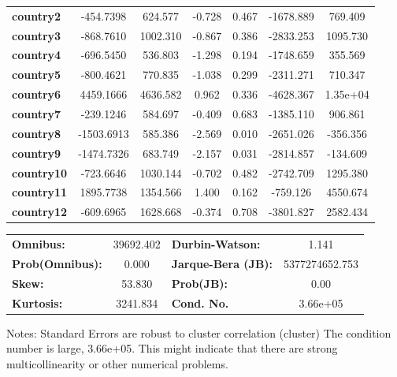 \begin{center}
\begin{tabular}{lcccccc}
\textbf{country2}  &    -454.7398  &      624.577     &    -0.728  &         0.467        &    -1678.889    &      769.409     \\
\textbf{country3}  &    -868.7610  &     1002.310     &    -0.867  &         0.386        &    -2833.253    &     1095.730     \\
\textbf{country4}  &    -696.5450  &      536.803     &    -1.298  &         0.194        &    -1748.659    &      355.569     \\
\textbf{country5}  &    -800.4621  &      770.835     &    -1.038  &         0.299        &    -2311.271    &      710.347     \\
\textbf{country6}  &    4459.1666  &     4636.582     &     0.962  &         0.336        &    -4628.367    &     1.35e+04     \\
\textbf{country7}  &    -239.1246  &      584.697     &    -0.409  &         0.683        &    -1385.110    &      906.861     \\
\textbf{country8}  &   -1503.6913  &      585.386     &    -2.569  &         0.010        &    -2651.026    &     -356.356     \\
\textbf{country9}  &   -1474.7326  &      683.749     &    -2.157  &         0.031        &    -2814.857    &     -134.609     \\
\textbf{country10} &    -723.6646  &     1030.144     &    -0.702  &         0.482        &    -2742.709    &     1295.380     \\
\textbf{country11} &    1895.7738  &     1354.566     &     1.400  &         0.162        &     -759.126    &     4550.674     \\
\textbf{country12} &    -609.6965  &     1628.668     &    -0.374  &         0.708        &    -3801.827    &     2582.434     \\
\bottomrule
\end{tabular}
\begin{tabular}{lclc}
\textbf{Omnibus:}       & 39692.402 & \textbf{  Durbin-Watson:     } &       1.141     \\
\textbf{Prob(Omnibus):} &    0.000  & \textbf{  Jarque-Bera (JB):  } & 5377274652.753  \\
\textbf{Skew:}          &   53.830  & \textbf{  Prob(JB):          } &        0.00     \\
\textbf{Kurtosis:}      &  3241.834 & \textbf{  Cond. No.          } &    3.66e+05     \\
\bottomrule
\end{tabular}
\end{center}

Notes: \newline
 [1] Standard Errors are robust to cluster correlation (cluster) \newline
 [2] The condition number is large, 3.66e+05. This might indicate that there are \newline
 strong multicollinearity or other numerical problems.